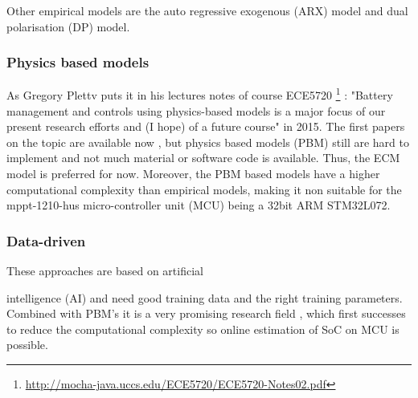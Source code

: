 Other empirical models are the auto regressive exogenous (ARX) model and dual polarisation (DP) model. %

\subsubsection{Physics based models}
\label{section:Physics based models}

As Gregory Plettv puts it in his lectures notes of course ECE5720  \footnote{ \url{http://mocha-java.uccs.edu/ECE5720/ECE5720-Notes02.pdf}} :  "Battery management and controls using physics-based models is a major focus of our present research efforts and (I hope) of a future
course" in 2015. The first papers on the topic are available now \cite{9477587}, but physics based models (PBM) still are hard to implement and not much material or software code is available. Thus, the ECM model is preferred for now. Moreover, the PBM based models have a higher computational complexity than
empirical models, making it non suitable for the mppt-1210-hus micro-controller unit (MCU) being a 32bit ARM STM32L072. %


\subsubsection{Data-driven}
\label{section:Data-driven}

These approaches are based on artificial

intelligence (AI) and need good training data and the right training parameters. Combined with PBM's it is a very promising research field \cite{9477587}, which first successes to reduce the computational complexity so online estimation of SoC on MCU is	 possible.





